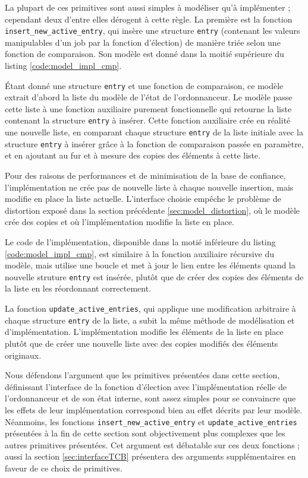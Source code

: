 		La plupart de ces primitives sont aussi simples à modéliser qu'à implémenter ; cependant deux d'entre elles dérogent à cette règle. La première est la fonction \texttt{insert\_new\_active\_entry}, qui insère une structure \texttt{entry} (contenant les valeurs manipulables d'un job par la fonction d'élection) de manière triée selon une fonction de comparaison. Son modèle est donné dans la moitié supérieure du listing \ref{code:model_impl_cmp}.

		Étant donné une structure \texttt{entry} et une fonction de comparaison, ce modèle extrait d'abord la liste du modèle de l'état de l'ordonnanceur. Le modèle passe cette liste à une fonction auxiliaire purement fonctionnelle qui retourne la liste contenant la structure \texttt{entry} à insérer. Cette fonction auxiliaire crée en réalité une nouvelle liste, en comparant chaque structure \texttt{entry} de la liste initiale avec la structure \texttt{entry} à insérer grâce à la fonction de comparaison passée en paramètre, et en ajoutant au fur et à mesure des copies des éléments à cette liste.

		Pour des raisons de performances et de minimisation de la base de confiance, l'implémentation ne crée pas de nouvelle liste à chaque nouvelle insertion, mais modifie en place la liste actuelle. L'interface choisie empêche le problème de distortion exposé dans la section précédente \ref{sec:model_distortion}, où le modèle crée des copies et où l'implémentation modifie la liste en place.

		Le code de l'implémentation, disponible dans la motié inférieure du listing \ref{code:model_impl_cmp}, est similaire à la fonction auxiliaire récursive du modèle, mais utilise une boucle et met à jour le lien entre les éléments quand la nouvelle struture \texttt{entry} est insérée, plutôt que de créer des copies des éléments de la liste en les réordonnant correctement. 

		La fonction \texttt{update\_active\_entries}, qui applique une modification arbitraire à chaque structure \texttt{entry} de la liste, a subit la même méthode de modélisation et d'implémentation. L'implémentation modifie les éléments de la liste en place plutôt que de créer une nouvelle liste avec des copies modifiés des éléments originaux.

	\label{sec:implementation}

		Nous défendons l'argument que les primitives présentées dans cette section, définissant l'interface de la fonction d'élection avec l'implémentation réelle de l'ordonnanceur et de son état interne, sont assez simples pour se convaincre que les effets de leur implémentation correspond bien au effet décrits par leur modèle. Néanmoins, les fonctions \texttt{insert\_new\_active\_entry} et \texttt{update\_active\_entries} présentées à la fin de cette section sont objectivement plus complexes que les autres primitives présentées. Cet argument est débatable sur ces deux fonctions ; aussi la section \ref{sec:interfaceTCB} présentera des arguments supplémentaires en faveur de ce choix de primitives.

